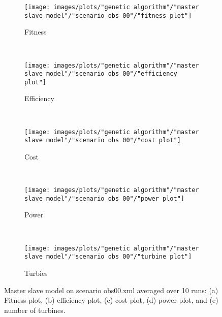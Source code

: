\begin{figure}[h!]
    \centering
      \begin{subfigure}[b]{0.31\textwidth}
        \texttt{[image: images/plots/"genetic algorithm"/"master slave model"/"scenario obs 00"/"fitness plot"]}
        \caption{Fitness}
        \hfill
        \label{plot:master slave model fitness plot scenario 00}
    \end{subfigure}
    ~
      \begin{subfigure}[b]{0.31\textwidth}
        \texttt{[image: images/plots/"genetic algorithm"/"master slave model"/"scenario obs 00"/"efficiency plot"]}
        \caption{Efficiency}
        \hfill
        \label{plot:single point crossover}
    \end{subfigure}
    ~
    \begin{subfigure}[b]{0.31\textwidth}
        \texttt{[image: images/plots/"genetic algorithm"/"master slave model"/"scenario obs 00"/"cost plot"]}
        \caption{Cost}
        \hfill
        \label{plot:single point crossover}
    \end{subfigure}
    ~
    \begin{subfigure}[b]{0.31\textwidth}
        \texttt{[image: images/plots/"genetic algorithm"/"master slave model"/"scenario obs 00"/"power plot"]}
        \caption{Power}
        \hfill
        \label{plot:two point crossover}
    \end{subfigure}
    ~
    \begin{subfigure}[b]{0.31\textwidth}
        \texttt{[image: images/plots/"genetic algorithm"/"master slave model"/"scenario obs 00"/"turbine plot"]}
        \caption{Turbies}
        \hfill
        \label{plot:uniform crossover}
    \end{subfigure}
    \caption{Master slave model on scenario obs00.xml averaged over 10 runs: (a) Fitness plot, (b) efficiency plot, (c) cost plot, (d) power plot, and (e) number of turbines.}
    \label{plot:master slave scenario obs 00}
\end{figure}


